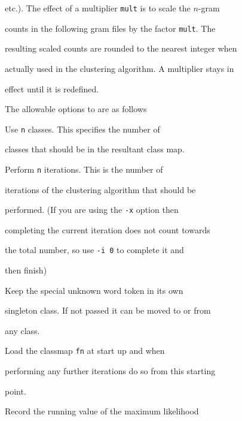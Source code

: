 etc.). The effect of a multiplier \texttt{mult} is to scale the $n$-gram


counts in the following gram files by the factor \texttt{mult}. The


resulting scaled counts are rounded to the nearest integer when


actually used in the clustering algorithm. A multiplier stays in


effect until it is redefined.





The allowable options to  are as follows


\begin{optlist}





   Use {\tt n} classes. This specifies the number of


        classes that should be in the resultant class map.





   Perform {\tt n} iterations. This is the number of


        iterations of the clustering algorithm that should be


        performed. (If you are using the {\tt -x} option then


        completing the current iteration does not count towards


        the total number, so use {\tt -i 0} to complete it and


        then finish)





   Keep the special unknown word token in its own


        singleton class.  If not passed it can be moved to or from


        any class.





   Load the classmap {\tt fn} at start up and when


        performing any further iterations do so from this starting


        point.





   Record the running value of the maximum likelihood



\end{optlist}

